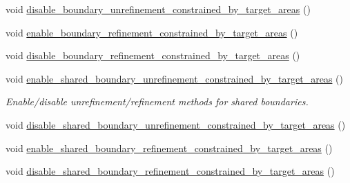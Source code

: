 \begin{DoxyCompactItemize}
$$void \hyperlink{classoomph_1_1RefineableTriangleMesh_a1c02ef23cd60668f2fa34f13bbc7b5ba}{disable\+\_\+boundary\+\_\+unrefinement\+\_\+constrained\+\_\+by\+\_\+target\+\_\+areas} ()
\item 
void \hyperlink{classoomph_1_1RefineableTriangleMesh_a6aa74a37a5c5416613c8a6d12ad7320c}{enable\+\_\+boundary\+\_\+refinement\+\_\+constrained\+\_\+by\+\_\+target\+\_\+areas} ()
\item 
void \hyperlink{classoomph_1_1RefineableTriangleMesh_a58d4a0b0d1d72b325d738affcef905e9}{disable\+\_\+boundary\+\_\+refinement\+\_\+constrained\+\_\+by\+\_\+target\+\_\+areas} ()
\item 
void \hyperlink{classoomph_1_1RefineableTriangleMesh_a3c1e3be7d06a03d0707f4f9f68c168b9}{enable\+\_\+shared\+\_\+boundary\+\_\+unrefinement\+\_\+constrained\+\_\+by\+\_\+target\+\_\+areas} ()
\begin{DoxyCompactList}\small\item\em Enable/disable unrefinement/refinement methods for shared boundaries. \end{DoxyCompactList}\item 
void \hyperlink{classoomph_1_1RefineableTriangleMesh_a6f8615dc6e68b6a8fdf0e4f3b5bb1e12}{disable\+\_\+shared\+\_\+boundary\+\_\+unrefinement\+\_\+constrained\+\_\+by\+\_\+target\+\_\+areas} ()
\item 
void \hyperlink{classoomph_1_1RefineableTriangleMesh_adc4d8e616b73c6b3805501fe4761b24f}{enable\+\_\+shared\+\_\+boundary\+\_\+refinement\+\_\+constrained\+\_\+by\+\_\+target\+\_\+areas} ()
\item 
void \hyperlink{classoomph_1_1RefineableTriangleMesh_a7c0a6d1e167ae19275556d3bb1a6b232}{disable\+\_\+shared\+\_\+boundary\+\_\+refinement\+\_\+constrained\+\_\+by\+\_\+target\+\_\+areas} ()
\end{DoxyCompactItemize}
